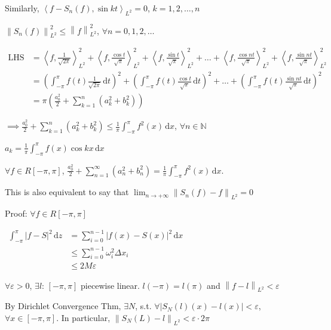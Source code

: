 Similarly, $\left<f-S_n(f),\sin kt\right>_{L^2}=0$, $k=1,2,\dots,n$

$\left\|S_n(f)\right\|_{L^2}^2\leq\left\|f\right\|_{L^2}^2$, $\forall n=0,1,2,\dots$

\begin{align*}
    \text{LHS}
     & =\left<f,\frac{1}{\sqrt{2\pi}}\right>_{L^2}^2+\left<f,\frac{\cos t}{\sqrt{\pi}}\right>_{L^2}^2+\left<f,\frac{\sin t}{\sqrt{\pi}}\right>_{L^2}^2+\dots+\left<f,\frac{\cos nt}{\sqrt{\pi}}\right>_{L^2}^2+\left<f,\frac{\sin nt}{\sqrt{\pi}}\right>_{L^2}^2 \\
     & =\left(\int_{-\pi}^{\pi}f(t)\frac{1}{\sqrt{2\pi}}\,\mathrm{d}t\right)^2+\left(\int_{-\pi}^{\pi}f(t)\frac{\cos t}{\sqrt{\pi}}\,\mathrm{d}t\right)^2+\dots+\left(\int_{-\pi}^{\pi}f(t)\frac{\sin nt}{\sqrt{\pi}}\,\mathrm{d}t\right)^2                      \\
     & =\pi\left(\frac{a_0^2}{2}+\sum_{k=1}^n\left(a_k^2+b_k^2\right)\right)
\end{align*}

$\implies\frac{a_0^2}{2}+\sum_{k=1}^n\left(a_k^2+b_k^2\right)\leq\frac{1}{\pi}\int_{-\pi}^{\pi}f^2(x)\,\mathrm{d}x$, $\forall n\in\mathbb{N}$

$a_k=\frac{1}{\pi}\int_{-\pi}^{\pi}f(x)\cos kx\,\mathrm{d}x$

\begin{theorem}
    $\forall f\in R[-\pi,\pi]$, $\frac{a_0^2}{2}+\sum_{n=1}^{\infty}\left(a_n^2+b_n^2\right)=\frac{1}{\pi}\int_{-\pi}^{\pi}f^2(x)\,\mathrm{d}x$.

    This is also equivalent to say that $\lim_{n\to+\infty}\left\|S_n(f)-f\right\|_{L^2}=0$
\end{theorem}

Proof: $\forall f\in R[-\pi,\pi]$

$\begin{aligned}
        \int_{-\pi}^{\pi}|f-S|^2\,\mathrm{d}z & =\sum_{i=0}^{n-1}|f(x)-S(x)|^2\,\mathrm{d}x \\
                                              & \leq\sum_{i=0}^{n-1}\omega_i^2\Delta x_i    \\
                                              & \leq 2M\varepsilon
    \end{aligned}$

$\forall \varepsilon>0$, $\exists l:\,[-\pi,\pi]$ piecewise linear. $l(-\pi)=l(\pi)$ and $\left\|f-l\right\|_{L^2}<\varepsilon$

By Dirichlet Convergence Thm, $\exists N$, s.t. $\forall\left|S_N(l)(x)-l(x)\right|<\varepsilon$, $\forall x\in[-\pi,\pi]$. In particular, $\left\|S_N(L)-l\right\|_{L^2}<\varepsilon\cdot 2\pi$

